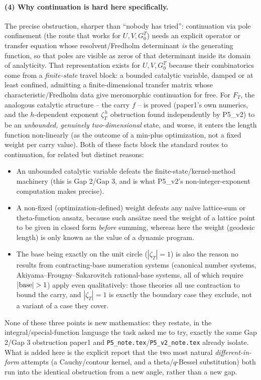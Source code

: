 \documentclass[11pt]{article}
\begin{document}
\paragraph{(4) Why continuation is hard here specifically.} The precise
obstruction, sharper than ``nobody has tried'': continuation via pole
confinement (the route that works for $U,V,G^T_0$) needs an explicit operator
or transfer equation whose resolvent/Fredholm determinant \emph{is} the
generating function, so that poles are visible as zeros of that determinant
inside its domain of analyticity. That representation exists for $U,V,G^T_0$
because their combinatorics come from a \emph{finite-state} travel block: a
bounded catalytic variable, damped or at least confined, admitting a
finite-dimensional transfer matrix whose characteristic/Fredholm data give
meromorphic continuation for free. For $F_T$, the analogous catalytic
structure -- the carry $f$ -- is proved (paper1's own numerics, and the
$h$-dependent exponent $\zeta_T^{\,h}$ obstruction found independently by
P5\_v2) to be an \emph{unbounded, genuinely two-dimensional} state, and worse,
it enters the length function non-linearly (as the outcome of a min-plus
optimization, not a fixed weight per carry value). Both of these facts block
the standard routes to continuation, for related but distinct reasons:
\begin{itemize}
\item An unbounded catalytic variable defeats the finite-state/kernel-method
machinery (this is Gap 2/Gap 3, and is what P5\_v2's non-integer-exponent
computation makes precise).
\item A non-fixed (optimization-defined) weight defeats any na\"ive lattice-sum
or theta-function ansatz, because such ans\"atze need the weight of a lattice
point to be given in closed form \emph{before} summing, whereas here the
weight (geodesic length) is only known as the value of a dynamic program.
\item The base being exactly on the unit circle ($|\zeta_T|=1$) is also the
reason no results from contracting-base numeration systems (canonical number
systems, Akiyama--Frougny--Sakarovitch rational-base systems, all of which
require $|{\rm base}|>1$) apply even qualitatively: those theories all use
contraction to bound the carry, and $|\zeta_T|=1$ is exactly the boundary case
they exclude, not a variant of a case they cover.
\end{itemize}
None of these three points is new mathematics: they restate, in the
integral/special-function language the task asked me to try, exactly the same
Gap 2/Gap 3 obstruction paper1 and \texttt{P5\_note.tex}/\texttt{P5\_v2\_note.tex}
already isolate. What is added here is the explicit report that the two most
natural \emph{different-in-form} attempts (a Cauchy/contour kernel, and a
theta/$q$-Bessel substitution) both run into the identical obstruction from a
new angle, rather than a new gap.
\end{document}
